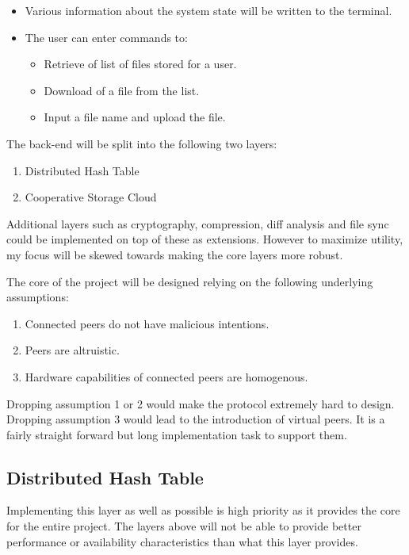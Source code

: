 \documentclass[12pt]{article}
\begin{document}
\begin{itemize}
\item{Various information about the system state will be written to the terminal.}
\item{The user can enter commands to:}
\begin{itemize}
	\item{Retrieve of list of files stored for a user.}
	\item{Download of a file from the list.}
	\item{Input a file name and upload the file.}

\end{itemize}
\end{itemize}

The back-end will be split into the following two layers:

\begin{enumerate}
\item{Distributed Hash Table}
\item{Cooperative Storage Cloud}
\end{enumerate}

Additional layers such as cryptography, compression, diff analysis and file sync could be implemented on top of these as extensions. However to maximize utility, my focus will be skewed towards making the core layers more robust.

The core of the project will be designed relying on the following underlying assumptions:
\begin{enumerate}
\item{Connected peers do not have malicious intentions.}
\item{Peers are altruistic.}
\item{Hardware capabilities of connected peers are homogenous.}
\end{enumerate}

Dropping assumption 1 or 2 would make the protocol extremely hard to design. Dropping assumption 3 would lead to the introduction of virtual peers.\cite{dabekcfs}\cite{chord} It is a fairly straight forward but long implementation task to support them.

\subsection{Distributed Hash Table}
Implementing this layer as well as possible is high priority as it provides the core for the entire project. The layers above will not be able to provide better performance or availability characteristics than what this layer provides.
\end{document}
